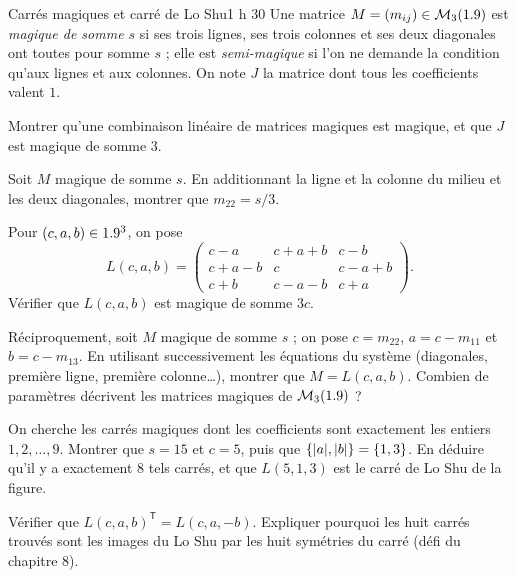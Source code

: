 

\begin{defi}{Carrés magiques et carré de Lo Shu}{1 h 30}
Une matrice $M=(m_{ij})\in\mathcal{M}_3(1.9)$ est \emph{magique de somme $s$}
si ses trois lignes, ses trois colonnes et ses deux diagonales ont toutes
pour somme $s$ ; elle est \emph{semi-magique} si l'on ne demande la
condition qu'aux lignes et aux colonnes. On note $J$ la matrice dont tous
les coefficients valent $1$.

\begin{questions}
  \item Montrer qu'une combinaison linéaire de matrices magiques est
    magique, et que $J$ est magique de somme $3$.
  \item Soit $M$ magique de somme $s$. En additionnant la ligne et la
    colonne du milieu et les deux diagonales, montrer que $m_{22}=s/3$.
  \item Pour $(c,a,b)\in1.9^{3}$, on pose
    \[
    L(c,a,b)=\begin{pmatrix}c-a&c+a+b&c-b\\ c+a-b&c&c-a+b\\ c+b&c-a-b&c+a\end{pmatrix}.
    \]
    Vérifier que $L(c,a,b)$ est magique de somme $3c$.
  \item Réciproquement, soit $M$ magique de somme $s$ ; on pose
    $c=m_{22}$, $a=c-m_{11}$ et $b=c-m_{13}$. En utilisant successivement
    les équations du système (diagonales, première ligne, première
    colonne\dots), montrer que $M=L(c,a,b)$. Combien de paramètres
    décrivent les matrices magiques de $\mathcal{M}_3(1.9)$ ?
\end{questions}

\begin{questions}[resume]
  \item On cherche les carrés magiques dont les coefficients sont
    exactement les entiers $1,2,\dots,9$. Montrer que $s=15$ et $c=5$, puis
    que $\left\{|a|,|b|\right\}=\left\{1,3\right\}$. En déduire qu'il y a exactement $8$ tels
    carrés, et que $L(5,1,3)$ est le carré de Lo Shu de la figure.
  \item Vérifier que $L(c,a,b)^{\mathsf T}=L(c,a,-b)$. Expliquer pourquoi les
    huit carrés trouvés sont les images du Lo Shu par les huit symétries du
    carré (défi du chapitre 8).
\end{questions}


\end{defi}
